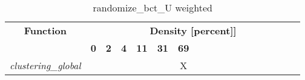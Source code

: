 \begin{table}[h] \centering \begin{tabular}{|l|c|c|c|c|c|c|} \hline\multicolumn{1}{|c|}{\textbf{\large{Function}}} & \multicolumn{17}{c|}{\large{\textbf{Density [percent]]}}}\\\cline{2-18}  & \textbf{0} &  \textbf{2} &  \textbf{4} &  \textbf{11} &  \textbf{31} &  \textbf{69} \\ \hline   \textit{clustering\_global} &   &   &   &   &   & X \\ \hline \end{tabular}\caption{randomize\_bct\_U weighted}\label{tab:my_label} \end{table}